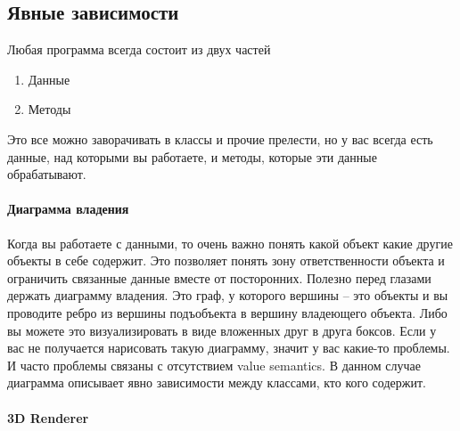\subsection{Явные зависимости}
\label{section::Explicitness}

Любая программа всегда состоит из двух частей
\begin{enumerate}
\item Данные

\item Методы
\end{enumerate}
Это все можно заворачивать в классы и прочие прелести, но у вас всегда есть данные, над которыми вы работаете, и методы, которые эти данные обрабатывают.

\paragraph{Диаграмма владения}

Когда вы работаете с данными, то очень важно понять какой объект какие другие объекты в себе содержит.
Это позволяет понять зону ответственности объекта и ограничить связанные данные вместе от посторонних.
Полезно перед глазами держать диаграмму владения.
Это граф, у которого вершины -- это объекты и вы проводите ребро из вершины подъобъекта в вершину владеющего объекта.
Либо вы можете это визуализировать в виде вложенных друг в друга боксов.
Если у вас не получается нарисовать такую диаграмму, значит у вас какие-то проблемы.
И часто проблемы связаны с отсутствием value semantics.
В данном случае диаграмма описывает явно зависимости между классами, кто кого содержит.

\paragraph{3D Renderer}

